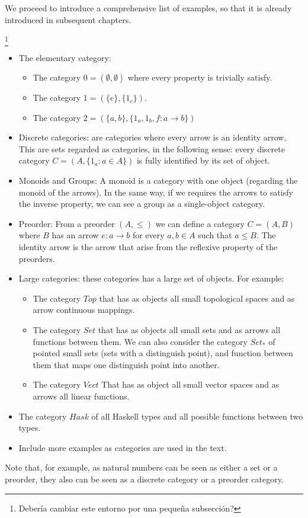 We proceed to introduce a comprehensive list of examples, so that it is already introduced in subsequent chapters. 
\begin{example} \footnote{Debería cambiar este entorno por una pequeña subsección?} 

  \begin{itemize}  
\item The elementary category:
  \begin{itemize}
  \item The category $0 = ( \emptyset, \emptyset)$ where every property is trivially satisfy.
  \item The category $1 = (\{e\},\{1_e\})$.
  \item The category $2 = (\{a,b\},\{1_a,1_b,f:a\to b\})$
  \end{itemize}

\item Discrete categories: are categories where every arrow is an identity arrow. This are sets regarded as categories, in the following sense: every discrete category $C=(A, \{1_a : a \in A\})$ is fully identified by its set of object.  
\item Monoids and Groups: A monoid is a category with one object (regarding the monoid of the arrows). In the same way, if we requires the arrows to satisfy the inverse property, we can see a group as a single-object category. 
\item Preorder: From a preorder $(A, \le)$ we can define a category $C = (A, B)$ where $B$ has an arrow $e: a \to b$ for every $a,b\in A$ such that $a \le B$. The identity arrow is the arrow that arise from the reflexive property of the preorders. 

\item Large categories: these categories has a large set of objects. For example:
  \begin{itemize}
\item The category $Top$ that has as objects all small topological spaces and as arrow continuous mappings.
\item The category $Set$ that has as objects all small sets and as arrows all functions between them. We can also consider the category $Set_*$ of pointed small sets (sets with a distinguish point), and function between them that maps one distinguish point into another.  
\item The category $Vect$ That has as object all small vector spaces and as arrows all linear functions.
\end{itemize}

\item The category $Hask$ of all Haskell types and all possible functions between two types.
\item Include more examples as categories are used in the text.
\end{itemize}
Note that, for example, as natural numbers can be seen as either a set or a preorder, they also can be seen as a discrete category or a preorder category.
\end{example}







